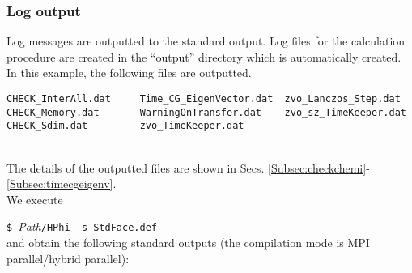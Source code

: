 \subsubsection{Log output}
Log messages are outputted to the standard output.
Log files for the calculation procedure are created in the ``output'' directory
which is automatically created.
In this example, the following files are outputted.\\
\begin{minipage}{16cm}
\begin{screen}
\begin{verbatim}
CHECK_InterAll.dat     Time_CG_EigenVector.dat  zvo_Lanczos_Step.dat  
CHECK_Memory.dat       WarningOnTransfer.dat    zvo_sz_TimeKeeper.dat
CHECK_Sdim.dat         zvo_TimeKeeper.dat
\end{verbatim}
\end{screen}
\end{minipage}
\\
The details of the outputted files are shown in Secs.
\ref{Subsec:checkchemi}-\ref{Subsec:timecgeigenv}.
\\
We execute

\hspace{-0.7cm}
\verb|$ |\textit{Path}\verb|/HPhi -s StdFace.def|
\\
and obtain the following standard outputs
(the compilation mode is MPI parallel/hybrid parallel):

